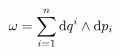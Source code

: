 \documentclass[preview]{standalone}
\begin{document}
\begin{align*}
\special{dvisvgm:raw <g id='unique000'>}\omega = \sum_{i=1}^{n}\mathrm{d}q^i\wedge\mathrm{d}p_i\special{dvisvgm:raw </g>}
\end{align*}
\end{document}
